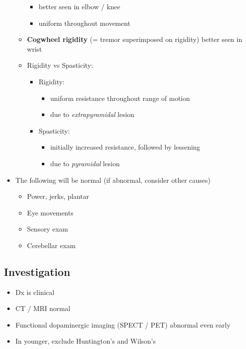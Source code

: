 \documentclass[
  12pt,
]{memoir}
\providecommand{\tightlist}{%
  \setlength{\itemsep}{0pt}\setlength{\parskip}{0pt}}
\begin{document}
\begin{itemize}
\begin{itemize}
    \begin{itemize}
    \tightlist
    \item
      better seen in elbow / knee
    \item
      uniform throughout movement
    \end{itemize}
  \item
    \textbf{Cogwheel rigidity} (= tremor superimposed on rigidity)
    better seen in wrist
  \item
    Rigidity vs Spasticity:

    \begin{itemize}
    \tightlist
    \item
      Rigidity:

      \begin{itemize}
      \tightlist
      \item
        uniform resistance throughout range of motion
      \item
        due to \emph{extrapyramidal} lesion
      \end{itemize}
    \item
      Spasticity:

      \begin{itemize}
      \tightlist
      \item
        initially increased resistance, followed by lessening
      \item
        due to \emph{pyramidal} lesion
      \end{itemize}
    \end{itemize}
  \end{itemize}
\item
  The following will be normal (if abnormal, consider other causes)

  \begin{itemize}
  \tightlist
  \item
    Power, jerks, plantar
  \item
    Eye movements
  \item
    Sensory exam
  \item
    Cerebellar exam
  \end{itemize}
\end{itemize}

\hypertarget{investigation-30}{%
\subsection{Investigation}\label{investigation-30}}

\begin{itemize}
\tightlist
\item
  Dx is clinical
\item
  CT / MRI normal
\item
  Functional dopaminergic imaging (SPECT / PET) abnormal even early
\item
  In younger, exclude Huntington's and Wilson's
\end{itemize}
\end{document}
